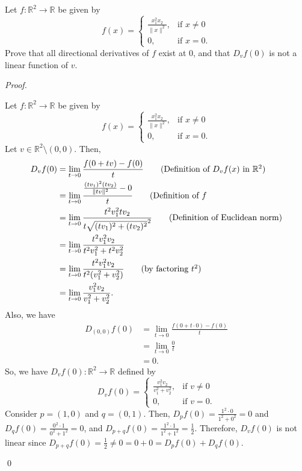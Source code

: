 \documentclass[12pt]{article}
\newenvironment{problem}[2][Problem]{\begin{trivlist}
\item[\hskip \labelsep {\bfseries #1}\hskip \labelsep {\bfseries
#2.}]}{\end{trivlist}}
\newenvironment{sol}
    {\emph{Proof.}
    }
    {
    \qed
    }
\begin{document}
  \begin{problem}{6} 
  Let $f: \mathbb{R}^2 \to \mathbb{R}$ be given by $$f(x) = \begin{cases} 
       \frac{x_1^2 x_2}{\lVert x \rVert^2}, & \text{if } x \neq 0 \\
        0, & \text{if } x = 0. 
     \end{cases}
  $$ Prove that all directional derivatives of $f$ exist at 0, and that $D_vf(0)$ is not a linear function of $v$.
  \end{problem}
  \begin{sol}
  Let $f: \mathbb{R}^2 \to \mathbb{R}$ be given by $$f(x) = \begin{cases} 
       \frac{x_1^2 x_2}{\lVert x \rVert^2}, & \text{if } x \neq 0 \\
        0, & \text{if } x = 0. 
     \end{cases}
  $$ Let $v \in \mathbb{R}^2 \setminus (0, 0)$. Then, \begin{align*}
      D_vf(0) &= \lim_{t \to 0} \frac{f(0 + tv) - f(0)}{t} \tag*{(Definition of $D_vf(x)$ in $\mathbb{R}^2$)} \\ &= \lim_{t \to 0} \frac{\frac{(tv_1)^2(tv_2)}{\lVert tv \rVert^2} - 0}{t} \tag*{(Definition of $f$} \\ &= \lim_{t \to 0} \frac{t^2v_1^2tv_2}{t\sqrt{(tv_1)^2+(tv_2)^2}^2} \tag*{(Definition of Euclidean norm)} \\ &= \lim_{t \to 0} \frac{t^2v_1^2v_2}{t^2v_1^2 + t^2v_2^2} \\ &= \lim_{t \to 0} \frac{t^2v_1^2v_2}{t^2(v_1^2 + v_2^2)} \tag*{(by factoring $t^2$)} \\ &= \lim_{t \to 0} \frac{v_1^2v_2}{v_1^2 + v_2^2}.
  \end{align*}
  Also, we have \begin{align*}
      D_{(0, 0)}f(0) &= \lim_{t \to 0} \frac{f(0 + t \cdot 0) - f(0)}{t} \\ &= \lim_{t \to 0} \frac{0}{t} \\ &= 0.
  \end{align*}
  So, we have $D_vf(0):\mathbb{R}^2 \to \mathbb{R}$ defined by $$D_vf(0) = \begin{cases} 
       \frac{v_1^2 v_2}{v_1^2 + v_2^2}, & \text{if } v \neq 0 \\
        0, & \text{if } v = 0. 
     \end{cases}$$
  Consider $p = (1, 0)$ and $q = (0, 1)$. Then, $D_pf(0) = \frac{1^2 \cdot 0}{1^2 + 0^2} = 0$ and $D_qf(0) = \frac{0^2 \cdot 1}{0^2 + 1^2} = 0$, and $D_{p + q}f(0) = \frac{1^2 \cdot 1}{1^2 + 1^2} = \frac{1}{2}$. Therefore, $D_vf(0)$ is not linear since $D_{p + q}f(0) = \frac{1}{2} \neq 0 = 0 + 0 = D_pf(0) + D_qf(0)$.
  \end{sol}
  
\end{document}
